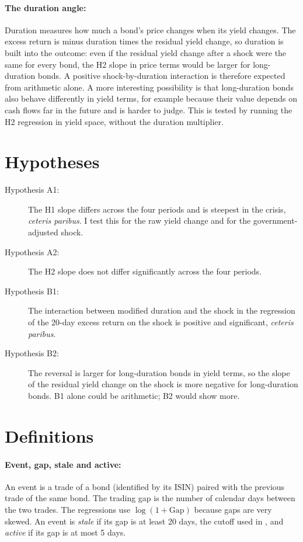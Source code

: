 \documentclass[a4paper,11pt]{article}
\begin{document}
\paragraph{The duration angle:} Duration measures how much a bond's price changes when its yield changes. The excess return is minus duration times the residual yield change, so duration is built into the outcome: even if the residual yield change after a shock were the same for every bond, the H2 slope in price terms would be larger for long-duration bonds. A positive shock-by-duration interaction is therefore expected from arithmetic alone. A more interesting possibility is that long-duration bonds also behave differently in yield terms, for example because their value depends on cash flows far in the future and is harder to judge. This is tested by running the H2 regression in yield space, without the duration multiplier.

\section{Hypotheses}
\begin{description}
	\item[Hypothesis A1:] The H1 slope differs across the four periods and is steepest in the crisis, \emph{ceteris paribus}. I test this for the raw yield change and for the government-adjusted shock.
	\item[Hypothesis A2:] The H2 slope does not differ significantly across the four periods.
	\item[Hypothesis B1:] The interaction between modified duration and the shock in the regression of the 20-day excess return on the shock is positive and significant, \emph{ceteris paribus}.
	\item[Hypothesis B2:] The reversal is larger for long-duration bonds in yield terms, so the slope of the residual yield change on the shock is more negative for long-duration bonds. B1 alone could be arithmetic; B2 would show more.
\end{description}

\section{Definitions}
\paragraph{Event, gap, stale and active:} An event is a trade of a bond (identified by its ISIN) paired with the previous trade of the same bond. The trading gap is the number of calendar days between the two trades. The regressions use $\log(1+\text{Gap})$ because gaps are very skewed. An event is \emph{stale} if its gap is at least 20 days, the cutoff used in \cite{kumar2026delayed}, and \emph{active} if its gap is at most 5 days.
\end{document}
